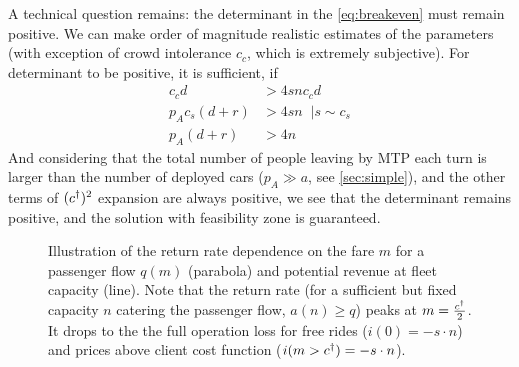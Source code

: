 \documentclass[a4paper]{report}
\begin{document}
A technical question remains: the determinant in the \autoref{eq:breakeven} must remain positive. We can make order of magnitude realistic estimates of the parameters (with exception of crowd intolerance $c_c$, which is extremely subjective). For determinant to be positive, it is sufficient, if 
\begin{align*}
	[p_Ac_s(d+r)]c_cd&>4snc_cd\\
	p_Ac_s(d+r)&>4sn\;\;|s\sim c_s\\
	p_A(d+r)&>4n
\end{align*}
And considering that the total number of people leaving by MTP each turn is larger than the number of deployed cars ($p_A\gg a$, see \autoref{sec:simple}), and the other terms of $(c^{\dagger})^2$ expansion are always positive, we see that the determinant remains positive, and the solution with feasibility zone is guaranteed.

\begin{figure}[h]
\centering
\caption{Illustration of the return rate dependence on the fare $m$ for a passenger flow $q(m)$ (parabola) and potential revenue at fleet capacity (line). Note that the return rate (for a sufficient but fixed capacity $n$ catering the passenger flow, $a(n)\geq q$) peaks at $m=\frac{c^{\dagger}}{2}$. It drops to the the full operation loss for free rides ($i(0)=-s\cdot n$) and prices above client cost function ($i(m>c^{\dagger})=-s\cdot n$).}
\label{gr:ridepricegraph}
\end{figure}
\end{document}
